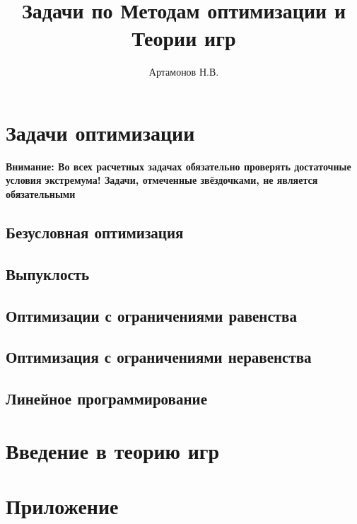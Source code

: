 \documentclass[12pt]{article}
\title{Задачи по Методам оптимизации и Теории игр}
\author{Артамонов Н.В.}
\theoremstyle{remark}
\begin{document}
\maketitle

\tableofcontents

\section{Задачи оптимизации}

\textbf{Внимание: Во всех расчетных задачах обязательно проверять достаточные условия экстремума!
Задачи, отмеченные звёздочками, не является обязательными}

\subsection{Безусловная оптимизация}



\subsection{Выпуклость}



\subsection{Оптимизации с ограничениями  равенства}



\subsection{Оптимизация с ограничениями неравенства}



\subsection{Линейное программирование}



\section{Введение в теорию игр}



\appendix

\section{Приложение}


\end{document}
